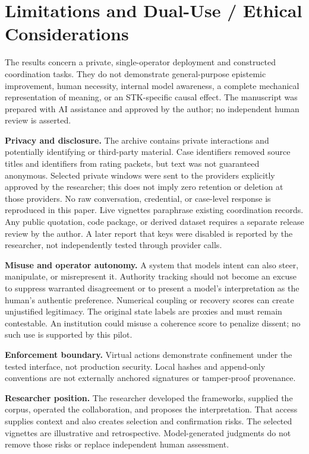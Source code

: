 \documentclass[11pt]{article}
\begin{document}
\label{main-text-end}
\clearpage



\clearpage
\appendix
\section{Limitations and Dual-Use / Ethical Considerations}\label{app:ethics}
The results concern a private, single-operator deployment and constructed coordination tasks. They do not demonstrate general-purpose epistemic improvement, human necessity, internal model awareness, a complete mechanical representation of meaning, or an STK-specific causal effect. The manuscript was prepared with AI assistance and approved by the author; no independent human review is asserted.

\textbf{Privacy and disclosure.} The archive contains private interactions and potentially identifying or third-party material. Case identifiers removed source titles and identifiers from rating packets, but text was not guaranteed anonymous. Selected private windows were sent to the providers explicitly approved by the researcher; this does not imply zero retention or deletion at those providers. No raw conversation, credential, or case-level response is reproduced in this paper. Live vignettes paraphrase existing coordination records. Any public quotation, code package, or derived dataset requires a separate release review by the author. A later report that keys were disabled is reported by the researcher, not independently tested through provider calls.

\textbf{Misuse and operator autonomy.} A system that models intent can also steer, manipulate, or misrepresent it. Authority tracking should not become an excuse to suppress warranted disagreement or to present a model's interpretation as the human's authentic preference. Numerical coupling or recovery scores can create unjustified legitimacy. The original state labels are proxies and must remain contestable. An institution could misuse a coherence score to penalize dissent; no such use is supported by this pilot.

\textbf{Enforcement boundary.} Virtual actions demonstrate confinement under the tested interface, not production security. Local hashes and append-only conventions are not externally anchored signatures or tamper-proof provenance.

\textbf{Researcher position.} The researcher developed the frameworks, supplied the corpus, operated the collaboration, and proposes the interpretation. That access supplies context and also creates selection and confirmation risks. The selected vignettes are illustrative and retrospective. Model-generated judgments do not remove those risks or replace independent human assessment.
\end{document}

